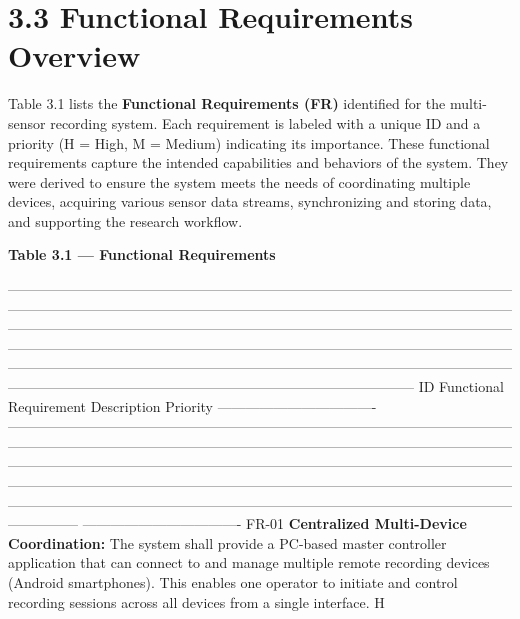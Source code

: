 \section{3.3 Functional Requirements Overview}

Table 3.1 lists the \textbf{Functional Requirements (FR)} identified for the
multi-sensor recording system. Each requirement is labeled with a unique
ID and a priority (H = High, M = Medium) indicating its importance.
These functional requirements capture the intended capabilities and
behaviors of the system. They were derived to ensure the system meets
the needs of coordinating multiple devices, acquiring various sensor
data streams, synchronizing and storing data, and supporting the
research workflow.

\textbf{Table 3.1 --- Functional Requirements}

  ---------------------------------------------------------------------------------------------------------------------------------------------------------------------------------------------------------------------------------------------------------------------------------------------------------------------------------------------------------------------------------------------------------------------------------------------------------------------------------------------------------------------------------------------------------------------------------------------------------------------------------------------------
  ID                      Functional Requirement Description                                                                                                                                                                                                                                                                                                                                                 Priority
  ---------------------------------- --------------------------------------------------------------------------------------------------------------------------------------------------------------------------------------------------------------------------------------------------------------------------------------------------------------------------------------------------------------------------------------------------------------------------------------------------------------------------------------------------------------------------------------------------------------------------- ----------------------------------
  FR-01                   \textbf{Centralized Multi-Device Coordination:} The system shall provide a PC-based master controller application that can connect to and manage multiple remote recording devices (Android smartphones). This enables one operator to initiate and control recording sessions across all devices from a single interface.                                                              H

